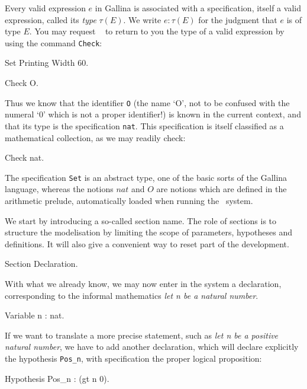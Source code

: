 \documentclass[11pt,a4paper]{book}
\begin{document}
Every valid expression $e$ in Gallina is associated with a specification,
itself a valid expression, called its {\sl type} $\tau(E)$. We write
$e:\tau(E)$ for the judgment that $e$ is of type $E$. 
You may request \Coq~ to return to you the type of a valid expression by using
the command \verb:Check::

\begin{coq_eval}
Set Printing Width 60.
\end{coq_eval}

\begin{coq_example}
Check O.
\end{coq_example}

Thus we know that the identifier \verb:O: (the name `O', not to be
confused with the numeral `0' which is not a proper identifier!) is
known in the current context, and that its type is the specification 
\verb:nat:. This specification is itself classified as a mathematical
collection, as we may readily check:

\begin{coq_example}
Check nat.
\end{coq_example}

The specification \verb:Set: is an abstract type, one of the basic
sorts of the Gallina language, whereas the notions $nat$ and $O$ are
notions which are defined in the arithmetic prelude,
automatically loaded when running the \Coq\ system.

We start by introducing a so-called section name. The role of sections
is to structure the modelisation by limiting the scope of parameters,
hypotheses and definitions. It will also give a convenient way to
reset part of the development.

\begin{coq_example}
Section Declaration.
\end{coq_example}
With what we already know, we may now enter in the system a declaration,
corresponding to the informal mathematics {\sl let n be a natural
  number}. 

\begin{coq_example}
Variable n : nat.
\end{coq_example}

If we want to translate a more precise statement, such as
{\sl let n be a positive natural number},
we have to add another declaration, which will declare explicitly the
hypothesis \verb:Pos_n:, with specification the proper logical
proposition:
\begin{coq_example}
Hypothesis Pos_n : (gt n 0).
\end{coq_example}
\end{document}
